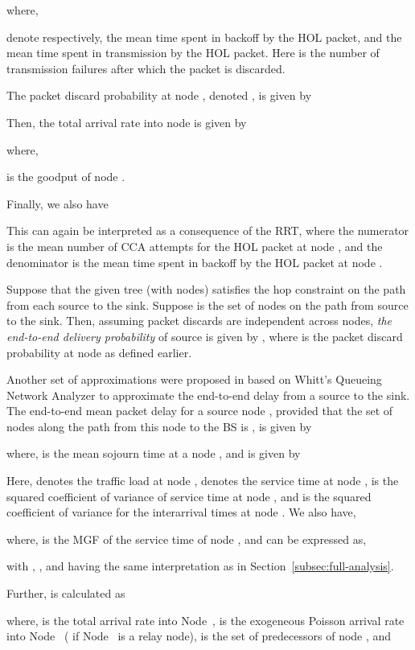 \documentclass[12pt, draftclsnofoot, onecolumn]{IEEEtran}
\begin{document}
where,

denote respectively, the mean time spent in backoff by the HOL packet, and the mean time spent in transmission by the HOL packet. Here  is the number of transmission failures after which the packet is discarded. 

The packet discard probability at node , denoted , is given by


Then, the total arrival rate into node  is given by

where, 

is the goodput of node . 

Finally, we also have

This can again be interpreted as a consequence of the RRT, where the numerator is the mean number of CCA attempts for the HOL packet at node , and the denominator is the mean time spent in backoff by the HOL packet at node . 
 
Suppose that the given tree (with  nodes) satisfies the hop constraint  on the path from each source to the sink. Suppose  is the set of nodes on the path from source  to the sink. Then, assuming packet discards are independent across nodes, \emph{the end-to-end delivery probability} of source  is given by , where  is the packet discard probability at node  as defined earlier.

Another set of approximations were proposed in \cite{srivastava} based on Whitt's Queueing Network Analyzer \cite{whitt83queueing-network-analyzer} to approximate the end-to-end delay from a source to the sink. The end-to-end mean packet delay for a source node , provided that the set of nodes along the path from this node to the BS is , is given by

where,  is the  mean sojourn time at a node , and is given by


Here,  denotes the traffic load at node ,  denotes the service time at node ,  is the squared coefficient of variance of service time at node , and  is the squared coefficient of variance for the interarrival times at node . We also have,


where,  is the MGF of the service time of node , and can be expressed as,

with , ,  and  having the same interpretation as in Section~\ref{subsec:full-analysis}. 

Further,  is calculated as 

where,  is the total arrival rate into Node~,  is the exogeneous Poisson arrival rate into Node~ ( if Node~ is a relay node),  is the set of predecessors of node , and 
\end{document}
